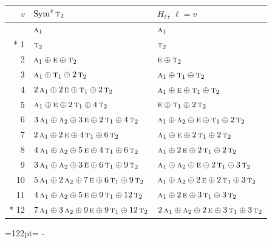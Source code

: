 \documentclass[10pt,a4paper]{article}
\newcommand{\needspace}[1]{\par\penalty-100\begingroup\dimen0=#1\relax\dimen2=\pagegoal
  \advance\dimen2-\pagetotal\ifdim\dimen0>\dimen2\relax\ifdim\dimen2>0pt\vfil\break\fi\fi
  \endgroup}
\numberwithin{equation}{section}
\newcommand{\irr}[1]{\text{\normalfont\scshape #1}}
\begin{document}
{\small\begin{longtable}{@{}rll@{}}\toprule
$v$ & $\operatorname{Sym}^{v}\irr{t}_{2}$ & $H_\ell$, $\ell = v$\\\midrule\endhead
\bottomrule\endfoot\endlastfoot
0 & $\irr{a}_{1}$ & $\irr{a}_{1}$\\*
1 & $\irr{t}_{2}$ & $\irr{t}_{2}$\\
2 & $\irr{a}_{1} \oplus \irr{e} \oplus \irr{t}_{2}$ & $\irr{e} \oplus \irr{t}_{2}$\\
3 & $\irr{a}_{1} \oplus \irr{t}_{1} \oplus 2\,\irr{t}_{2}$ & $\irr{a}_{1} \oplus \irr{t}_{1} \oplus \irr{t}_{2}$\\
4 & $2\,\irr{a}_{1} \oplus 2\,\irr{e} \oplus \irr{t}_{1} \oplus 2\,\irr{t}_{2}$ & $\irr{a}_{1} \oplus \irr{e} \oplus \irr{t}_{1} \oplus \irr{t}_{2}$\\
5 & $\irr{a}_{1} \oplus \irr{e} \oplus 2\,\irr{t}_{1} \oplus 4\,\irr{t}_{2}$ & $\irr{e} \oplus \irr{t}_{1} \oplus 2\,\irr{t}_{2}$\\
6 & $3\,\irr{a}_{1} \oplus \irr{a}_{2} \oplus 3\,\irr{e} \oplus 2\,\irr{t}_{1} \oplus 4\,\irr{t}_{2}$ & $\irr{a}_{1} \oplus \irr{a}_{2} \oplus \irr{e} \oplus \irr{t}_{1} \oplus 2\,\irr{t}_{2}$\\
7 & $2\,\irr{a}_{1} \oplus 2\,\irr{e} \oplus 4\,\irr{t}_{1} \oplus 6\,\irr{t}_{2}$ & $\irr{a}_{1} \oplus \irr{e} \oplus 2\,\irr{t}_{1} \oplus 2\,\irr{t}_{2}$\\
8 & $4\,\irr{a}_{1} \oplus \irr{a}_{2} \oplus 5\,\irr{e} \oplus 4\,\irr{t}_{1} \oplus 6\,\irr{t}_{2}$ & $\irr{a}_{1} \oplus 2\,\irr{e} \oplus 2\,\irr{t}_{1} \oplus 2\,\irr{t}_{2}$\\
9 & $3\,\irr{a}_{1} \oplus \irr{a}_{2} \oplus 3\,\irr{e} \oplus 6\,\irr{t}_{1} \oplus 9\,\irr{t}_{2}$ & $\irr{a}_{1} \oplus \irr{a}_{2} \oplus \irr{e} \oplus 2\,\irr{t}_{1} \oplus 3\,\irr{t}_{2}$\\
10 & $5\,\irr{a}_{1} \oplus 2\,\irr{a}_{2} \oplus 7\,\irr{e} \oplus 6\,\irr{t}_{1} \oplus 9\,\irr{t}_{2}$ & $\irr{a}_{1} \oplus \irr{a}_{2} \oplus 2\,\irr{e} \oplus 2\,\irr{t}_{1} \oplus 3\,\irr{t}_{2}$\\
11 & $4\,\irr{a}_{1} \oplus \irr{a}_{2} \oplus 5\,\irr{e} \oplus 9\,\irr{t}_{1} \oplus 12\,\irr{t}_{2}$ & $\irr{a}_{1} \oplus 2\,\irr{e} \oplus 3\,\irr{t}_{1} \oplus 3\,\irr{t}_{2}$\\*
12 & $7\,\irr{a}_{1} \oplus 3\,\irr{a}_{2} \oplus 9\,\irr{e} \oplus 9\,\irr{t}_{1} \oplus 12\,\irr{t}_{2}$ & $2\,\irr{a}_{1} \oplus \irr{a}_{2} \oplus 2\,\irr{e} \oplus 3\,\irr{t}_{1} \oplus 3\,\irr{t}_{2}$\\
\bottomrule\end{longtable}}
\needspace{122pt}
\end{document}
